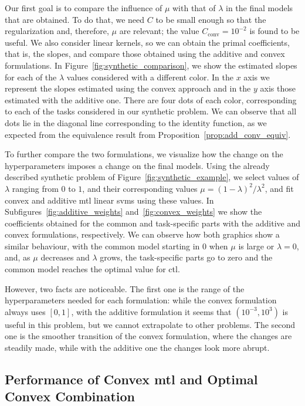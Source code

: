 Our first goal is to compare the influence of $\mu$ with that of $\lambda$ in the final models that are obtained. To do that, we need $C$ to be small enough so that the regularization and, therefore, $\mu$ are relevant; the value $C_{\text{conv}} = 10^{-2}$ is found to be useful. We also consider linear kernels, so we can obtain the primal coefficients, that is, the slopes, and compare those obtained using the additive and convex formulations. In Figure~\ref{fig:synthetic_comparison}, we show the estimated slopes for each of the $\lambda$ values considered with a different color. In the $x$ axis we represent the slopes estimated using the convex approach and in the $y$ axis those estimated with the additive one. There are four dots of each color, corresponding to each of the tasks considered in our synthetic problem. We can observe that all dots lie in the diagonal line corresponding to the identity function, as we expected from the equivalence result from Proposition~\ref{prop:add_conv_equiv}.

%
To further compare the two formulations, we visualize how the change on the hyperparameters imposes a change on the final models. Using the already described synthetic problem of Figure~\ref{fig:synthetic_example}, we select values of $\lambda$ ranging from $0$ to $1$, and their corresponding values $\mu = (1-\lambda)^2 / \lambda^2$, and fit convex and additive \acrshort{mtl} linear \acrshort{svm}s using these values. In Subfigures~\ref{fig:additive_weights} and~\ref{fig:convex_weights} we show the coefficients obtained for the common and task-specific parts with the additive and convex formulations, respectively.
%
We can observe how both graphics show a similar behaviour, with the common model starting in $0$ when $\mu$ is large or $\lambda=0$, and, as $\mu$ decreases and $\lambda$ grows, the task-specific parts go to zero and the common model reaches the optimal value for \acrshort{ctl}.
%

However, two facts are noticeable. The first one is the range of the hyperparameters needed for each formulation: while the convex formulation always uses $[0, 1]$, with the additive formulation it seems that $(10^{-3}, 10^3)$ is useful in this problem, but we cannot extrapolate to other problems. The second one is the smoother transition of the convex formulation, where the changes are steadily made, while with the additive one the changes look more abrupt.



\subsection{Performance of Convex \acrshort{mtl} and Optimal Convex Combination}

